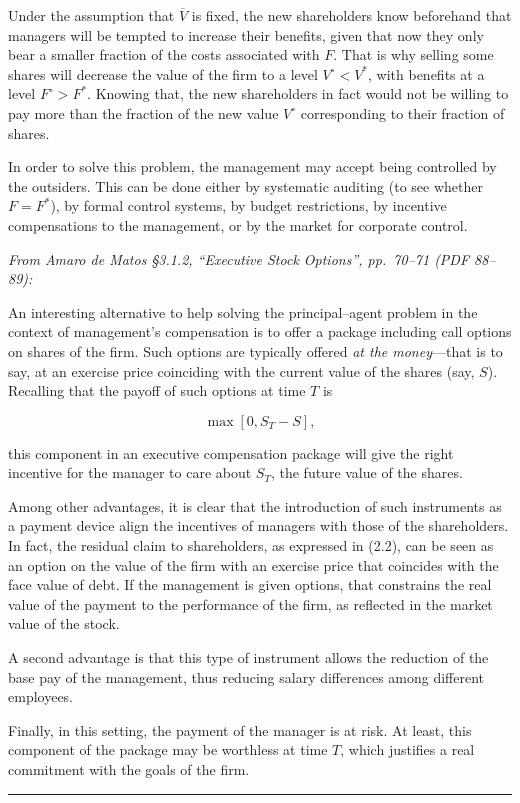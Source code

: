 \documentclass[11pt,a4paper]{article}
\newcommand{\stmtend}{\par\endgroup\nopagebreak\noindent\rule{\linewidth}{0.4pt}\par\medskip}
\begin{document}
Under the assumption that \(\overline{V}\) is fixed, the new shareholders know beforehand that
managers will be tempted to increase their benefits, given that now they only bear a smaller
fraction of the costs associated with \(F\). That is why selling some shares will decrease the value
of the firm to a level \(V^\circ < V^*\), with benefits at a level \(F^\circ > F^*\). Knowing that,
the new shareholders in fact would not be willing to pay more than the fraction of the new value
\(V^\circ\) corresponding to their fraction of shares.

In order to solve this problem, the management may accept being controlled by the outsiders. This
can be done either by systematic auditing (to see whether \(F = F^*\)), by formal control systems,
by budget restrictions, by incentive compensations to the management, or by the market for corporate
control.

\emph{From Amaro de Matos §3.1.2, ``Executive Stock Options'', pp.~70--71 (PDF 88--89):}

An interesting alternative to help solving the principal--agent problem in the context of
management's compensation is to offer a package including call options on shares of the firm. Such
options are typically offered \emph{at the money}---that is to say, at an exercise price coinciding
with the current value of the shares (say, \(S\)). Recalling that the payoff of such options at time
\(T\) is

\[\max[0, S_T - S],\]

this component in an executive compensation package will give the right incentive for the manager to
care about \(S_T\), the future value of the shares.

Among other advantages, it is clear that the introduction of such instruments as a payment device
align the incentives of managers with those of the shareholders. In fact, the residual claim to
shareholders, as expressed in (2.2), can be seen as an option on the value of the firm with an
exercise price that coincides with the face value of debt. If the management is given options, that
constrains the real value of the payment to the performance of the firm, as reflected in the market
value of the stock.

A second advantage is that this type of instrument allows the reduction of the base pay of the
management, thus reducing salary differences among different employees.

Finally, in this setting, the payment of the manager is at risk. At least, this component of the
package may be worthless at time \(T\), which justifies a real commitment with the goals of the
firm.
\stmtend
\end{document}
